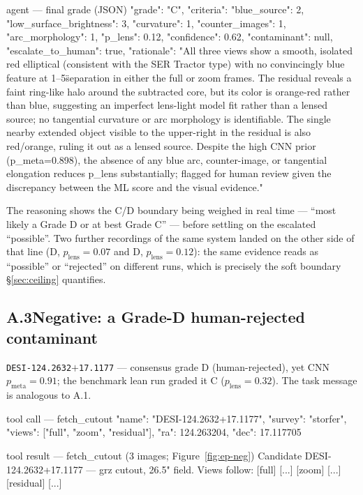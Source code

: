 \documentclass[11pt,letterpaper]{article}
\newcommand{\plens}{\ensuremath{p_{\mathrm{lens}}}}
\newcommand{\pmeta}{\ensuremath{p_{\mathrm{meta}}}}
\begin{document}
\begin{toolio}{agent --- final grade (JSON)}
{
  "grade": "C",
  "criteria": {"blue_source": 2, "low_surface_brightness": 3, "curvature": 1,
               "counter_images": 1, "arc_morphology": 1},
  "p_lens": 0.12,
  "confidence": 0.62,
  "contaminant": null,
  "escalate_to_human": true,
  "rationale": "All three views show a smooth, isolated red elliptical (consistent with the SER Tractor type) with no convincingly blue feature at 1–5\" separation in either the full or zoom frames. The residual reveals a faint ring-like halo around the subtracted core, but its color is orange-red rather than blue, suggesting an imperfect lens-light model fit rather than a lensed source; no tangential curvature or arc morphology is identifiable. The single nearby extended object visible to the upper-right in the residual is also red/orange, ruling it out as a lensed source. Despite the high CNN prior (p_meta=0.898), the absence of any blue arc, counter-image, or tangential elongation reduces p_lens substantially; flagged for human review given the discrepancy between the ML score and the visual evidence."
}
\end{toolio}

The reasoning shows the C/D boundary being weighed in real time --- ``most likely a
Grade D or at best Grade C'' --- before settling on the escalated ``possible''.
Two further recordings of the same system landed on the other side of that line
(D, $\plens=0.07$ and D, $\plens=0.12$): the same evidence reads as ``possible'' or
``rejected'' on different runs, which is precisely the soft boundary
\S\ref{sec:ceiling} quantifies.

\subsection*{A.3\quad Negative: a Grade-D human-rejected contaminant}
\texttt{DESI-124.2632$+$17.1177} --- consensus grade D (human-rejected), yet CNN
$\pmeta=0.91$; the benchmark lean run graded it C ($\plens=0.32$). The task message
is analogous to A.1.

\begin{toolio}{tool call --- fetch\_cutout}
{"name": "DESI-124.2632+17.1177", "survey": "storfer", "views": ["full", "zoom", "residual"], "ra": 124.263204, "dec": 17.117705}
\end{toolio}

\begin{toolio}{tool result --- fetch\_cutout (3 images; Figure~\ref{fig:ep-neg})}
Candidate DESI-124.2632+17.1177 — grz cutout, 26.5" field. Views follow:
[full] [...] [zoom] [...] [residual] [...]
\end{toolio}
\end{document}
